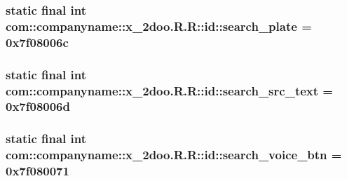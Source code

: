 \hypertarget{classcom_1_1companyname_1_1x__2doo_1_1_r_1_1id_27a8ec70a1e9e3c04896e2c3f9f5d82b}{
\subsubsection[{search\_\-plate}]{\setlength{\rightskip}{0pt plus 5cm}static final int com::companyname::x\_\-2doo.R.R::id::search\_\-plate = 0x7f08006c}}
\label{classcom_1_1companyname_1_1x__2doo_1_1_r_1_1id_27a8ec70a1e9e3c04896e2c3f9f5d82b}


\hypertarget{classcom_1_1companyname_1_1x__2doo_1_1_r_1_1id_c9001461ec79af10f47e458e41d50372}{
\subsubsection[{search\_\-src\_\-text}]{\setlength{\rightskip}{0pt plus 5cm}static final int com::companyname::x\_\-2doo.R.R::id::search\_\-src\_\-text = 0x7f08006d}}
\label{classcom_1_1companyname_1_1x__2doo_1_1_r_1_1id_c9001461ec79af10f47e458e41d50372}


\hypertarget{classcom_1_1companyname_1_1x__2doo_1_1_r_1_1id_09d033c85efa7834ac47b2f2efb33ae4}{
\subsubsection[{search\_\-voice\_\-btn}]{\setlength{\rightskip}{0pt plus 5cm}static final int com::companyname::x\_\-2doo.R.R::id::search\_\-voice\_\-btn = 0x7f080071}}
\label{classcom_1_1companyname_1_1x__2doo_1_1_r_1_1id_09d033c85efa7834ac47b2f2efb33ae4}


